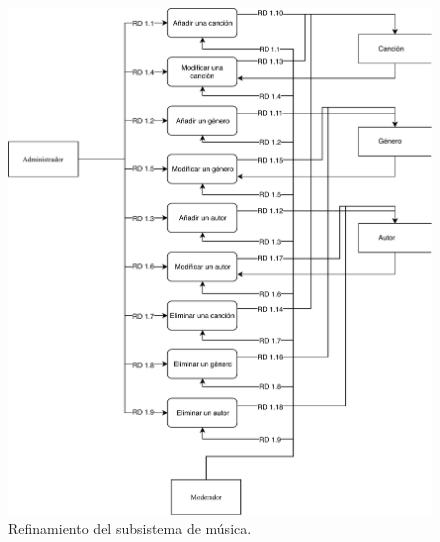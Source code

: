 \begin{figure}[H]
  \caption{Refinamiento del subsistema de música.}
  \centering
  \includegraphics[scale=0.9]{diagramas/musica2.pdf}
\end{figure}

